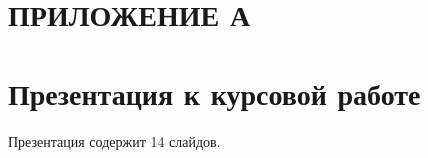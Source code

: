 \section*{\centering ПРИЛОЖЕНИЕ А}

\section*{Презентация к курсовой работе}
Презентация содержит 14 слайдов.